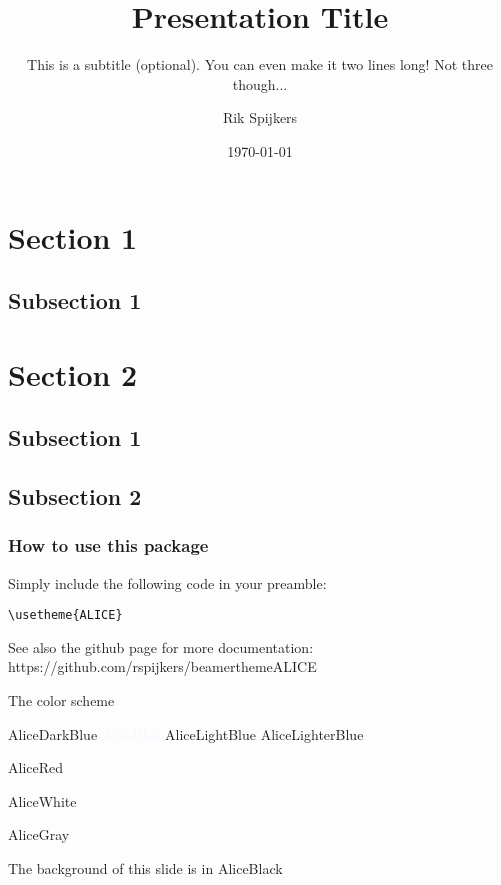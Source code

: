 \documentclass[compress]{beamer}
\title{Presentation Title}
\subtitle{This is a subtitle (optional). You can even make it two lines long! Not three though...}
\author{Rik Spijkers}
\institute{Institute, optional}
\date{\today}
\begin{document}
\begin{frame}
  \maketitle
\end{frame}

\begin{frame}
  \tableofcontents[]
\end{frame}

\section{Section 1}
\subsection{Subsection 1}
\section{Section 2}
\subsection{Subsection 1}
\subsection{Subsection 2}

\begin{frame}[fragile]
  \frametitle{How to use this package}
  Simply include the following code in your preamble:

  \begin{lstlisting}[basicstyle = \ttfamily\small]
    \usetheme{ALICE}
  \end{lstlisting}

  See also the github page for more documentation: \\
  https://github.com/rspijkers/beamerthemeALICE

\end{frame}

\begin{frame}{The color scheme}
  \begin{description}
    \item \textcolor{AliceDarkBlue}{AliceDarkBlue} \quad \textcolor{AliceBlue}{AliceBlue} \quad \textcolor{AliceLightBlue}{AliceLightBlue} \quad \textcolor{AliceLighterBlue}{AliceLighterBlue}\\
    \item \textcolor{AliceRed}{AliceRed}\\
    \item \textcolor{AliceWhite}{AliceWhite}\\
    \item \textcolor{AliceGray}{AliceGray}\\
    \item 
    \item The background of this slide is in AliceBlack
  \end{description}
\end{frame}
\end{document}

